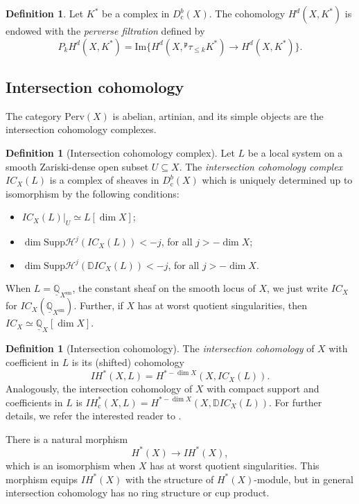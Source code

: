 \documentclass[JEP,XML,SOM,Unicode, NoEqCountersInSection,NoFloatCountersInSection,published]{cedram}
\let\mathcal\mathscr
\let\ra\rightarrow
\newcommand{\cc}{\mathrm{c}}
\newcommand{\IC}{\mathit{IC}}
\newcommand{\IH}{\mathit{IH}}
\theoremstyle{definition}
\newtheorem{defn}[thm]{Definition}
\newcommand{\QQ}{\mathbb{Q}}
\begin{document}
\begin{defn}
Let $K^*$ be a complex in $D^b_{\cc}(X)$. The cohomology $H^d(X, K^*)$ is endowed with the \emph{perverse filtration} defined by
\[
P_k H^d(X, K^*) = \mathrm{Im} \{H^d(X,{^{\mathfrak{p}}}{\tau}_{\leq k}K^*)\ra H^d(X,K^*)\}.
\]
\end{defn}

\subsection{Intersection cohomology}\label{sec:intercohom}
The category $\mathrm{Perv}(X)$ is abelian, artinian, and its simple objects are the intersection cohomology complexes.

\begin{defn}[Intersection cohomology complex]
Let $L$ be a local system on a smooth Zariski-dense open subset $U\subseteq X$.
The \emph{intersection cohomology complex} $\IC_X(L)$ is a complex of sheaves in $D^b_{\cc}(X)$ which is uniquely determined up to isomorphism by the following conditions:
\begin{itemize}
	\item $\IC_{X}(L)|_{U}\simeq L[\dim X]$;
	\item $\dim \mathrm{Supp}\mathcal{H}^j(\IC_{X}(L))<-j$, for all $j>-\dim X$;
	\item $\dim\mathrm{Supp}\mathcal{H}^j(\mathbb{D}\IC_{X}(L))<-j$, for all $j>-\dim X$.
\end{itemize}
\end{defn}
When $L=\underline{\QQ}_{X^{\mathrm{sm}}}$, \ie the constant sheaf on the smooth locus of $X$, we just write $\IC_X$ for $\IC_X(\underline{\QQ}_{X^{\mathrm{sm}}})$. Further, if $X$ has at worst quotient singularities, then $\IC_X\simeq \underline{\QQ}_{X}[\dim X]$.

\begin{defn}[Intersection cohomology]
The \emph{intersection cohomology} of $X$ with coefficient in $L$ is its (shifted) cohomology
	\[
\IH^*(X,L)=H^{*-\dim X}(X,\IC_X(L)).
\]
Analogously, the intersection cohomology of $X$ with compact support and coefficients in $L$ is
	$\IH_{\cc}^*(X,L)=H^{*-\dim X}(X,\mathbb{D}\IC_X(L))$. For further details, we refer the interested reader to \cite{KW2006}.
	\end{defn}
	
There is a natural morphism
\[
H^*(X)\to \IH^*(X),
\]
which is an isomorphism when $X$ has at worst quotient singularities. This morphism equips $\IH^*(X)$ with the structure of $H^*(X)$-module, but in general intersection coho\-mology has no ring structure or cup product.
\end{document}

